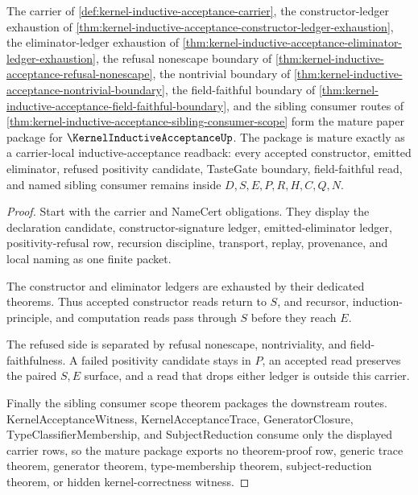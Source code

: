 \begin{theorem}
\label{thm:kernel-inductive-acceptance-mature-package}
The carrier of \autoref{def:kernel-inductive-acceptance-carrier}, the constructor-ledger exhaustion of \autoref{thm:kernel-inductive-acceptance-constructor-ledger-exhaustion}, the eliminator-ledger exhaustion of \autoref{thm:kernel-inductive-acceptance-eliminator-ledger-exhaustion}, the refusal nonescape boundary of \autoref{thm:kernel-inductive-acceptance-refusal-nonescape}, the nontrivial boundary of \autoref{thm:kernel-inductive-acceptance-nontrivial-boundary}, the field-faithful boundary of \autoref{thm:kernel-inductive-acceptance-field-faithful-boundary}, and the sibling consumer routes of \autoref{thm:kernel-inductive-acceptance-sibling-consumer-scope} form the mature paper package for $\KernelInductiveAcceptanceUp$. The package is mature exactly as a carrier-local inductive-acceptance readback: every accepted constructor, emitted eliminator, refused positivity candidate, TasteGate boundary, field-faithful read, and named sibling consumer remains inside $D,S,E,P,R,H,C,Q,N$.
\end{theorem}
\begin{proof}
Start with the carrier and NameCert obligations. They display the declaration candidate, constructor-signature ledger, emitted-eliminator ledger, positivity-refusal row, recursion discipline, transport, replay, provenance, and local naming as one finite packet.

The constructor and eliminator ledgers are exhausted by their dedicated theorems. Thus accepted constructor reads return to $S$, and recursor, induction-principle, and computation reads pass through $S$ before they reach $E$.

The refused side is separated by refusal nonescape, nontriviality, and field-faithfulness. A failed positivity candidate stays in $P$, an accepted read preserves the paired $S,E$ surface, and a read that drops either ledger is outside this carrier.

Finally the sibling consumer scope theorem packages the downstream routes. KernelAcceptanceWitness, KernelAcceptanceTrace, GeneratorClosure, TypeClassifierMembership, and SubjectReduction consume only the displayed carrier rows, so the mature package exports no theorem-proof row, generic trace theorem, generator theorem, type-membership theorem, subject-reduction theorem, or hidden kernel-correctness witness.
\end{proof}

